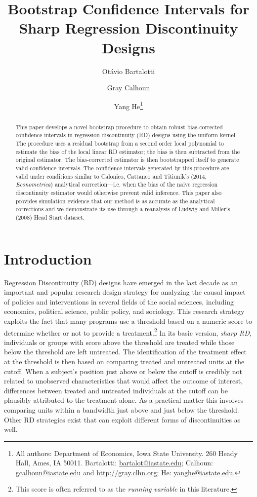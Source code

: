 \documentclass[12pt,fleqn]{article}
\title{Bootstrap Confidence Intervals for Sharp Regression Discontinuity Designs}
\author{Ot\'avio Bartalotti \and Gray Calhoun \and Yang He\thanks{%
  All authors: Department of Economics, Iowa State University.
  260 Heady Hall, Ames, IA 50011.
  Bartalotti: \protect\url{bartalot@iastate.edu};
  Calhoun: \protect\url{gcalhoun@iastate.edu} and
  \protect\url{http://gray.clhn.org};
  He: \protect\url{yanghe@iastate.edu}.}}
\begin{document}
\maketitle

\begin{abstract}\noindent
  This paper develops a novel bootstrap procedure to obtain robust
  bias-corrected confidence intervals in regression discontinuity (RD) designs
  using the uniform kernel. The procedure uses a residual bootstrap from a
  second order local polynomial to estimate the bias of the local linear RD
  estimator; the bias is then subtracted from the original estimator. The
  bias-corrected estimator is then bootstrapped itself to generate valid
  confidence intervals. The confidence intervals generated by this procedure
  are valid under conditions similar to Calonico, Cattaneo and Titiunik's
  (2014, \textit{Econometrica}) analytical correction---i.e.  when the bias of
  the naive regression discontinuity estimator would otherwise prevent valid
  inference. This paper also provides simulation evidence that our method is
  as accurate as the analytical corrections and we demonstrate its use through
  a reanalysis of Ludwig and Miller's (2008) Head Start dataset.
\end{abstract}

\section{Introduction}
Regression Discontinuity (RD) designs have emerged in the last decade as an
important and popular research design strategy for analyzing the causal impact
of policies and interventions in several fields of the social sciences,
including economics, political science, public policy, and sociology.  This
research strategy exploits the fact that many programs use a threshold based
on a numeric score to determine whether or not to provide a
treatment.\footnote{%
  This score is often referred to as the \textit{running variable} in this
  literature.} %
In its basic version, \textit{sharp RD}, individuals or groups with score
above the threshold are treated while those below the threshold are left
untreated. The identification of the treatment effect at the threshold is then
based on comparing treated and untreated units at the cutoff. When a subject's
position just above or below the cutoff is credibly not related to unobserved
characteristics that would affect the outcome of interest, differences between
treated and untreated individuals at the cutoff can be plausibly attributed to
the treatment alone. As a practical matter this involves comparing units
within a bandwidth just above and just below the threshold. Other RD
strategies exist that can exploit different forms of discontinuities as well.
\end{document}
